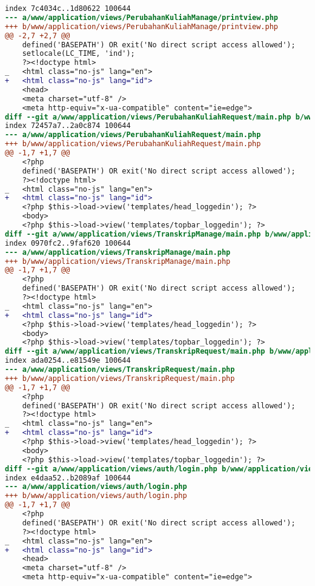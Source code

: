 \begin{lstlisting}[frame=single, label={lst:perbaikan_3.1.1_bahasa_halaman}, language=diff, caption=Perbaikan Kriteria Sukses 3.1.1]
index 7c4034c..1d80622 100644
--- a/www/application/views/PerubahanKuliahManage/printview.php
+++ b/www/application/views/PerubahanKuliahManage/printview.php
@@ -2,7 +2,7 @@
    defined('BASEPATH') OR exit('No direct script access allowed');
    setlocale(LC_TIME, 'ind');
    ?><!doctype html>
_   <html class="no-js" lang="en">
+   <html class="no-js" lang="id">
    <head>
    <meta charset="utf-8" />
    <meta http-equiv="x-ua-compatible" content="ie=edge">
diff --git a/www/application/views/PerubahanKuliahRequest/main.php b/www/application/views/PerubahanKuliahRequest/main.php
index 72457a7..2a0c874 100644
--- a/www/application/views/PerubahanKuliahRequest/main.php
+++ b/www/application/views/PerubahanKuliahRequest/main.php
@@ -1,7 +1,7 @@
    <?php
    defined('BASEPATH') OR exit('No direct script access allowed');
    ?><!doctype html>
_   <html class="no-js" lang="en">
+   <html class="no-js" lang="id">
    <?php $this->load->view('templates/head_loggedin'); ?>
    <body>
    <?php $this->load->view('templates/topbar_loggedin'); ?>
diff --git a/www/application/views/TranskripManage/main.php b/www/application/views/TranskripManage/main.php
index 0970fc2..9faf620 100644
--- a/www/application/views/TranskripManage/main.php
+++ b/www/application/views/TranskripManage/main.php
@@ -1,7 +1,7 @@
    <?php
    defined('BASEPATH') OR exit('No direct script access allowed');
    ?><!doctype html>
_   <html class="no-js" lang="en">
+   <html class="no-js" lang="id">
    <?php $this->load->view('templates/head_loggedin'); ?>
    <body>
    <?php $this->load->view('templates/topbar_loggedin'); ?>
diff --git a/www/application/views/TranskripRequest/main.php b/www/application/views/TranskripRequest/main.php
index ada0254..e81549e 100644
--- a/www/application/views/TranskripRequest/main.php
+++ b/www/application/views/TranskripRequest/main.php
@@ -1,7 +1,7 @@
    <?php
    defined('BASEPATH') OR exit('No direct script access allowed');
    ?><!doctype html>
_   <html class="no-js" lang="en">
+   <html class="no-js" lang="id">
    <?php $this->load->view('templates/head_loggedin'); ?>
    <body>
    <?php $this->load->view('templates/topbar_loggedin'); ?>
diff --git a/www/application/views/auth/login.php b/www/application/views/auth/login.php
index e4daa52..b2089af 100644
--- a/www/application/views/auth/login.php
+++ b/www/application/views/auth/login.php
@@ -1,7 +1,7 @@
    <?php
    defined('BASEPATH') OR exit('No direct script access allowed');
    ?><!doctype html>
_   <html class="no-js" lang="en">
+   <html class="no-js" lang="id">
    <head>
    <meta charset="utf-8" />
    <meta http-equiv="x-ua-compatible" content="ie=edge">
\end{lstlisting}

